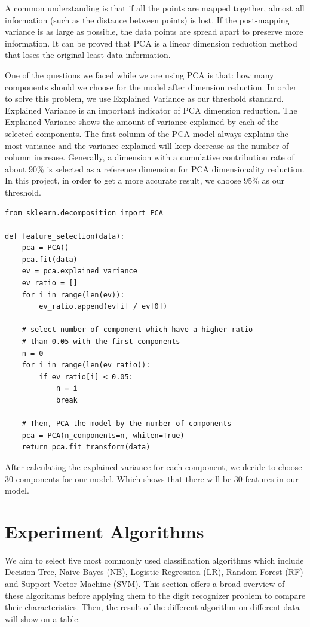 \documentclass[sigconf]{acmart}
\begin{document}
A common understanding is that if all the points are mapped together, almost all information (such as the distance between points) is lost. If the post-mapping variance is as large as possible, the data points are spread apart to preserve more information. It can be proved that PCA is a linear dimension reduction method that loses the original least data information.

One of the questions we faced while we are using PCA is that: how many components should we choose for the model after dimension reduction. In order to solve this problem, we use Explained Variance as our threshold standard. Explained Variance is an important indicator of PCA dimension reduction. The Explained Variance shows the amount of variance explained by each of the selected components. The first column of the PCA model always explains the most variance and the variance explained will keep decrease as the number of column increase. Generally, a dimension with a cumulative contribution rate of about 90\% is selected as a reference dimension for PCA dimensionality reduction. In this project, in order to get a more accurate result, we choose 95\% as our threshold.

\begin{lstlisting}
from sklearn.decomposition import PCA

def feature_selection(data):
    pca = PCA()
    pca.fit(data)
    ev = pca.explained_variance_
    ev_ratio = []
    for i in range(len(ev)):
        ev_ratio.append(ev[i] / ev[0])

    # select number of component which have a higher ratio
    # than 0.05 with the first components
    n = 0
    for i in range(len(ev_ratio)):
        if ev_ratio[i] < 0.05:
            n = i
            break

    # Then, PCA the model by the number of components
    pca = PCA(n_components=n, whiten=True)
    return pca.fit_transform(data)
\end{lstlisting}

After calculating the explained variance for each component, we decide to choose 30 components for our model. Which shows that there will be 30 features in our model.

\section{Experiment Algorithms}

We aim to select five most commonly used classification algorithms which include Decision Tree, Naive Bayes (NB), Logistic Regression (LR), Random Forest (RF) and Support Vector Machine (SVM). This section offers a broad overview of these algorithms before applying them to the digit recognizer problem to compare their characteristics. Then, the result of the different algorithm on different data will show on a table.
\end{document}
